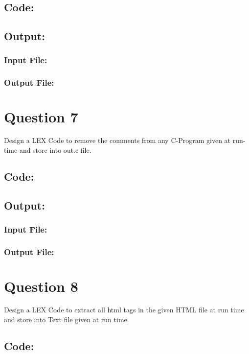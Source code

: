 \documentclass{article}
\begin{document}
\subsection*{Code:}

\subsection*{Output:}
\subsubsection*{Input File:}

\subsubsection*{Output File:}


\newpage
\section*{Question 7}
Design a LEX Code to remove the comments from any C-Program
given at run-time and store into out.c file.
\subsection*{Code:}

\newpage
\subsection*{Output:}
\subsubsection*{Input File:}

\subsubsection*{Output File:}


\newpage
\section*{Question 8}
Design a LEX Code to extract all html tags in the given HTML file
at run time and store into Text file given at run time.
\subsection*{Code:}

\newpage
\end{document}
